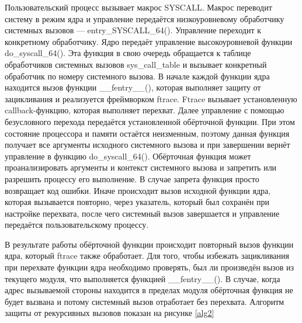 Пользовательский процесс вызывает макрос SYSCALL. Макрос
переводит систему в режим ядра и управление передаётся низкоуровневому
обработчику системных вызовов — entry\_SYSCALL\_64(). Управление
переходит к конкретному обработчику. Ядро передаёт управление
высокоуровневой функции do\_syscall\_64(). Эта функция в свою очередь
обращается к таблице обработчиков системных вызовов sys\_call\_table и
вызывает конкретный обработчик по номеру системного вызова. В
начале каждой функции ядра находится вызов функции \_\_fentry\_\_(), которая
выполняет защиту от зацикливания и реализуется фреймворком ftrace.
Ftrace вызывает установленную callback-функцию, которая выполняет
перехват. Далее управление с помощью безусловного перехода передаётся
установленной обёрточной функции. При этом состояние процессора и памяти
остаётся неизменным, поэтому данная функция получает все аргументы
исходного системного вызова и при завершении вернёт управление в функцию
do\_syscall\_64(). Обёрточная функция может проанализировать аргументы и
контекст системного вызова и запретить или разрешить процессу его
выполнение. В случае запрета функция просто возвращает код ошибки. Иначе
происходит вызов исходной функции ядра, которая вызывается повторно,
через указатель, который был сохранён при настройке перехвата, после чего
системный вызов завершается и управление передаётся пользовательскому
процессу.

В результате работы обёрточной функции происходит повторный вызов
функции ядра, который ftrace также обработает. Для того, чтобы избежать
зацикливания при перехвате функции ядра необходимо проверять, был ли
произведён вызов из текущего модуля, что выполняется функцией
\_\_fentry\_\_(). В случае, когда адрес вызываемой стороны находится в пределах
модуля обёрточная функция не будет вызвана и потому системный вызов
отработает без перехвата. Алгоритм защиты от рекурсивных вызовов показан
на рисунке \ref{alg2}

